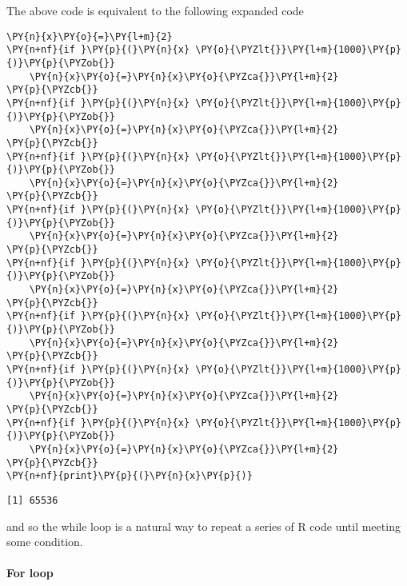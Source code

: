 The above code is equivalent to the following expanded code

    \begin{tcolorbox}[breakable, size=fbox, boxrule=1pt, pad at break*=1mm,colback=cellbackground, colframe=cellborder]
\begin{Verbatim}[commandchars=\\\{\}]
\PY{n}{x}\PY{o}{=}\PY{l+m}{2}
\PY{n+nf}{if }\PY{p}{(}\PY{n}{x} \PY{o}{\PYZlt{}}\PY{l+m}{1000}\PY{p}{)}\PY{p}{\PYZob{}}
    \PY{n}{x}\PY{o}{=}\PY{n}{x}\PY{o}{\PYZca{}}\PY{l+m}{2}
\PY{p}{\PYZcb{}}
\PY{n+nf}{if }\PY{p}{(}\PY{n}{x} \PY{o}{\PYZlt{}}\PY{l+m}{1000}\PY{p}{)}\PY{p}{\PYZob{}}
    \PY{n}{x}\PY{o}{=}\PY{n}{x}\PY{o}{\PYZca{}}\PY{l+m}{2}
\PY{p}{\PYZcb{}}
\PY{n+nf}{if }\PY{p}{(}\PY{n}{x} \PY{o}{\PYZlt{}}\PY{l+m}{1000}\PY{p}{)}\PY{p}{\PYZob{}}
    \PY{n}{x}\PY{o}{=}\PY{n}{x}\PY{o}{\PYZca{}}\PY{l+m}{2}
\PY{p}{\PYZcb{}}
\PY{n+nf}{if }\PY{p}{(}\PY{n}{x} \PY{o}{\PYZlt{}}\PY{l+m}{1000}\PY{p}{)}\PY{p}{\PYZob{}}
    \PY{n}{x}\PY{o}{=}\PY{n}{x}\PY{o}{\PYZca{}}\PY{l+m}{2}
\PY{p}{\PYZcb{}}
\PY{n+nf}{if }\PY{p}{(}\PY{n}{x} \PY{o}{\PYZlt{}}\PY{l+m}{1000}\PY{p}{)}\PY{p}{\PYZob{}}
    \PY{n}{x}\PY{o}{=}\PY{n}{x}\PY{o}{\PYZca{}}\PY{l+m}{2}
\PY{p}{\PYZcb{}}
\PY{n+nf}{if }\PY{p}{(}\PY{n}{x} \PY{o}{\PYZlt{}}\PY{l+m}{1000}\PY{p}{)}\PY{p}{\PYZob{}}
    \PY{n}{x}\PY{o}{=}\PY{n}{x}\PY{o}{\PYZca{}}\PY{l+m}{2}
\PY{p}{\PYZcb{}}
\PY{n+nf}{if }\PY{p}{(}\PY{n}{x} \PY{o}{\PYZlt{}}\PY{l+m}{1000}\PY{p}{)}\PY{p}{\PYZob{}}
    \PY{n}{x}\PY{o}{=}\PY{n}{x}\PY{o}{\PYZca{}}\PY{l+m}{2}
\PY{p}{\PYZcb{}}
\PY{n+nf}{if }\PY{p}{(}\PY{n}{x} \PY{o}{\PYZlt{}}\PY{l+m}{1000}\PY{p}{)}\PY{p}{\PYZob{}}
    \PY{n}{x}\PY{o}{=}\PY{n}{x}\PY{o}{\PYZca{}}\PY{l+m}{2}
\PY{p}{\PYZcb{}}
\PY{n+nf}{print}\PY{p}{(}\PY{n}{x}\PY{p}{)}
\end{Verbatim}
\end{tcolorbox}

    \begin{Verbatim}[commandchars=\\\{\}]
[1] 65536
    \end{Verbatim}

    and so the while loop is a natural way to repeat a series of R code
until meeting some condition.

    \hypertarget{for-loop}{%
\paragraph{For loop}\label{for-loop}}

